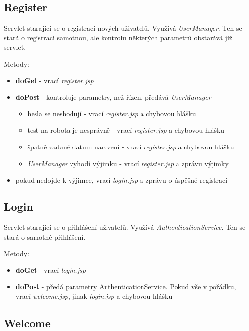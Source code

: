 \documentclass[
12pt,
a4paper,
pdftex,
czech,
titlepage
]{report}
\begin{document}
\subsection{Register}

Servlet starající se o registraci nových uživatelů. Využívá \textit{UserManager}. Ten se stará o registraci samotnou, ale kontrolu některých parametrů obstarává již servlet. 

Metody:
\begin{itemize}
\item \textbf{doGet} - vrací \textit{register.jsp}
\item \textbf{doPost} - kontroluje parametry, než řízení předává \textit{UserManager}
\begin{itemize}
\item hesla se neshodují - vrací \textit{register.jsp} a chybovou hlášku
\item test na robota je nesprávně - vrací \textit{register.jsp} a chybovou hlášku
\item špatně zadané datum narození - vrací \textit{register.jsp} a chybovou hlášku
\item \textit{UserManager} vyhodí výjimku - vrací \textit{register.jsp} a zprávu výjimky

\end{itemize}
\item pokud nedojde k výjimce, vrací \textit{login.jsp} a zprávu o úspěšné registraci
\end{itemize}

\subsection{Login}

Servlet starající se o přihlášení uživatelů. Využívá \textit{AuthenticationService}. Ten se stará o samotné přihlášení.

Metody:
\begin{itemize}
\item \textbf{doGet} - vrací \textit{login.jsp}
\item \textbf{doPost} - předá parametry AuthenticationService. Pokud vše v pořádku, vrací \textit{welcome.jsp}, jinak \textit{login.jsp} a chybovou hlášku
\end{itemize}

\subsection{Welcome}
\end{document}
